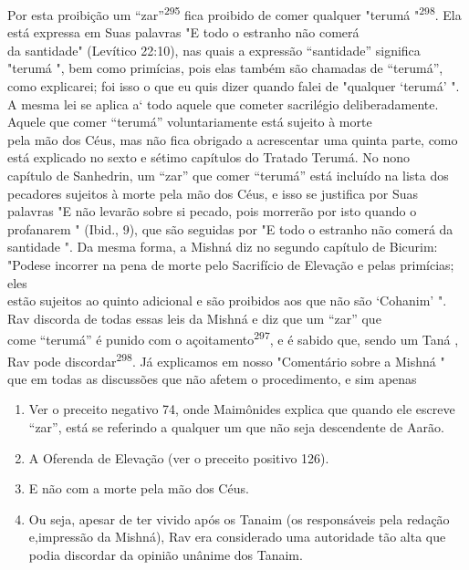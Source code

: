 Por esta proibição um ``zar''\textsuperscript{295} fica proibido de comer
qualquer "terumá
"\textsuperscript{298}. Ela está expressa em Suas palavras "E todo o
estranho não comerá\\
da santidade" (Levítico 22:10), nas quais a expressão ``santidade''
significa "terumá
", bem como primícias, pois elas também são chamadas de ``terumá'',
como
explicarei; foi isso o que eu quis dizer quando falei de "qualquer
`terumá' ".\\
A mesma lei se aplica a` todo aquele que cometer sacrilégio
deliberadamente.\\
Aquele que comer ``terumá'' voluntariamente está sujeito à morte\\
pela mão dos Céus, mas não fica obrigado a acrescentar uma quinta parte,
como
está explicado no sexto e sétimo capítulos do Tratado Terumá. No
nono\\
capítulo de Sanhedrin, um ``zar'' que comer ``terumá'' está incluído na
lista dos\\
pecadores sujeitos à morte pela mão dos Céus, e isso se justifica por
Suas palavras
"E não levarão sobre si pecado, pois morrerão por isto quando o
profanarem
" (Ibid., 9), que são seguidas por "E todo o estranho não comerá da
santidade
". Da mesma forma, a Mishná diz no segundo capítulo de Bicurim:
"Podese
incorrer na pena de morte pelo Sacrifício de Elevação e pelas
primícias; eles\\
estão sujeitos ao quinto adicional e são proibidos aos que não são
`Cohanim' ".\\
Rav discorda de todas essas leis da Mishná e diz que um ``zar'' que\\
come ``terumá'' é punido com o açoitamento\textsuperscript{297}, e é
sabido que, sendo um Taná
, Rav pode discordar\textsuperscript{298}. Já explicamos em nosso
"Comentário sobre a Mishná
" que em todas as discussões que não afetem o procedimento, e sim
apenas

\begin{enumerate}
\def\labelenumi{\arabic{enumi}.}
\setcounter{enumi}{294}
\item
 
 Ver o preceito negativo 74, onde Maimônides explica que quando ele
 escreve ``zar'', está se referindo a qualquer um que não seja
 descendente de Aarão.
 
\item
 
 A Oferenda de Elevação (ver o preceito positivo 126).
 
\item
 
 E não com a morte pela mão dos Céus.
 
\item
 
 Ou seja, apesar de ter vivido após os Tanaim (os responsáveis pela
 redação e,impressão da Mishná), Rav era considerado uma autoridade tão
 alta que podia discordar da opinião unânime dos Tanaim.
 
\end{enumerate}


